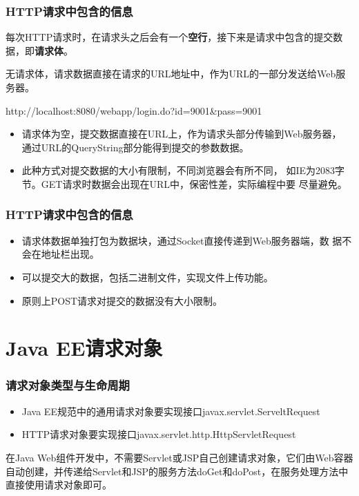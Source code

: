 \begin{frame} %
  \frametitle{HTTP请求中包含的信息} 


  每次HTTP请求时，在请求头之后会有一个{\bf\Red 空行}，接下来是请求中包含的提交数据，即{\bf\Blue 请求体}。


  无请求体，请求数据直接在请求的URL地址中，作为URL的一部分发送给Web服务器。
  
  \begin{xmlCode}
    http://localhost:8080/webapp/login.do?id=9001&pass=9001
  \end{xmlCode}

  \pause
  
  \begin{itemize}
  \item 请求体为空，提交数据直接在URL上，作为请求头部分传输到Web服务器，
    通过URL的QueryString部分能得到提交的参数数据。
  \item 此种方式对提交数据的大小有限制，不同浏览器会有所不同，
    如IE为2083字节。GET请求时数据会出现在URL中，保密性差，实际编程中要
    尽量避免。
\end{itemize}

\end{frame}

\begin{frame} %
  \frametitle{HTTP请求中包含的信息} 


  \begin{itemize}
  \item 请求体数据单独打包为数据块，通过Socket直接传递到Web服务器端，数
    据不会在地址栏出现。
  \item 可以提交大的数据，包括二进制文件，实现文件上传功能。
  \item 原则上POST请求对提交的数据没有大小限制。
  \end{itemize}
\end{frame}

\section{Java EE请求对象}

\begin{frame}
\frametitle{请求对象类型与生命周期} 
\begin{itemize}
\item Java EE规范中的通用请求对象要实现接口javax.servlet.ServeltRequest
\item HTTP请求对象要实现接口javax.servlet.http.HttpServletRequest
\end{itemize}


在Java Web组件开发中，不需要Servlet或JSP自己创建请求对象，它们由Web容器自动创建，并传递给Servlet和JSP的服务方法doGet和doPost，在服务处理方法中直接使用请求对象即可。
\end{frame}

